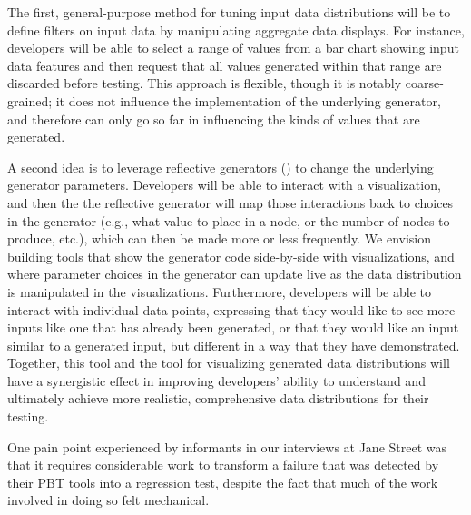The first, general-purpose method for tuning input data distributions will be to
define filters on input data by manipulating aggregate data displays.
For instance, developers will be able to select a range of values from a bar
chart showing input data features and then request that all values generated
within that range are discarded before testing. This approach is flexible,
though it is notably coarse-grained;
it does not influence the implementation of the underlying generator, and
therefore can only go so far in influencing the kinds of values that are
generated.

A second idea is to leverage
reflective generators () to change the underlying
generator parameters. Developers will be able to interact with a visualization,
and then the the reflective generator will map those interactions
back to choices
in the generator (e.g., what value to place in a node, or the number of nodes to
produce, etc.), which can then be made more or less frequently. We envision
building tools that show the generator code
side-by-side with visualizations, and where parameter choices in the generator
can update live as the data distribution is manipulated in the visualizations.
Furthermore, developers will be able to interact with individual data points,
expressing that they would like to see more inputs like one that has already
been generated, or that they would like an input similar to a generated input,
but different in a way that they have demonstrated. Together, this tool and the
tool for visualizing generated data distributions will have a synergistic effect
in improving developers' ability to understand and ultimately achieve more
realistic, comprehensive data distributions for their testing.

%
One pain
point experienced
by informants in our interviews at Jane Street was that it requires considerable work to
transform a failure that was detected by their PBT tools into a
regression test, despite the fact that much of the work involved in doing so
felt mechanical.

